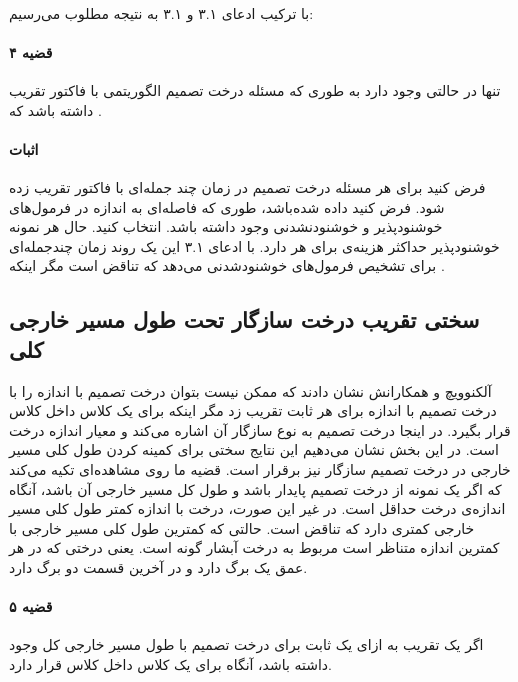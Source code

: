 \documentclass[a4paper]{article}
\begin{document}
	\paragraph{}
	با ترکیب ادعای ۳.۱ و ۳.۱ به نتیجه مطلوب می‌رسیم:
	\paragraph{قضیه ۴}
	تنها در حالتی
	وجود دارد به طوری که مسئله درخت تصمیم الگوریتمی با فاکتور تقریب
	داشته باشد که 
	.
	\paragraph{اثبات}
	فرض کنید برای هر
	مسئله درخت تصمیم در زمان چند جمله‌ای با فاکتور
	تقریب زده شود. فرض کنید
	داده شده‌باشد، طوری که فاصله‌ای به اندازه
	\lr{$\epsilon$}
	در فرمول‌های خوشنودپذیر و خوشنودنشدنی
	وجود داشته باشد. 
	انتخاب کنید. حال هر نمونه خوشنودپذیر حداکثر هزینه‌ی
	برای هر
	دارد. با ادعای ۳.۱ این یک روند زمان چندجمله‌ای برای تشخیص فرمول‌های خوشنودشدنی 
	می‌دهد که تناقض است مگر اینکه
	.
	\subsection{سختی تقریب درخت سازگار تحت طول مسیر خارجی کلی}
	آلکنوویچ و همکارانش نشان دادند که ممکن نیست بتوان درخت تصمیم با اندازه
	را با درخت تصمیم با اندازه
	برای هر ثابت
	تقریب زد مگر اینکه برای یک
	کلاس 
	داخل کلاس
	قرار بگیرد. در اینجا درخت تصمیم به نوع سازگار آن اشاره می‌کند و معیار اندازه درخت است. در این بخش نشان می‌دهیم
	این نتایج سختی برای کمینه کردن طول کلی مسیر خارجی در درخت تصمیم سازگار نیز برقرار است.
	قضیه ما روی مشاهده‌ای تکیه می‌کند که اگر 
	یک نمونه از درخت تصمیم پایدار باشد و طول کل مسیر خارجی آن
	باشد، آنگاه اندازه‌ی درخت 
	حداقل 
	است. در غیر این صورت، درخت با اندازه کمتر طول کلی مسیر خارجی کمتری دارد که تناقض است. حالتی که کمترین طول
	کلی مسیر خارجی 
	با کمترین اندازه
	متناظر است مربوط به درخت آبشار گونه است. یعنی درختی که در هر عمق یک برگ دارد و در آخرین قسمت دو برگ دارد.
	\paragraph{قضیه ۵}
	اگر یک تقریب
	به ازای یک ثابت
	برای درخت تصمیم با طول مسیر خارجی کل 
	وجود داشته باشد، آنگاه برای یک 
	کلاس 
	داخل کلاس
	قرار دارد. 
\end{document}
